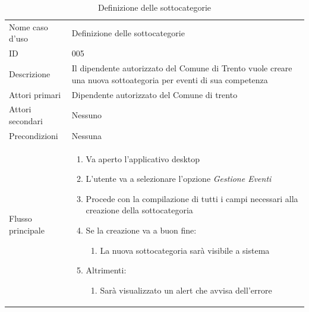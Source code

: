 \documentclass{article}
\begin{document}
\begin{table}[htbp]
    \centering
    \begin{tabularx}{\textwidth}{| l | p{} |}
        \Xhline{2pt} %
        Nome caso d'uso & Definizione delle sottocategorie \\
        \Xhline{2pt} %
        ID & 005 \\
        \hline
        Descrizione & Il dipendente autorizzato del Comune di Trento vuole creare una nuova sottoategoria per eventi di sua competenza\\
        \hline
        Attori primari & Dipendente autorizzato del Comune di trento\\
        \hline
        Attori secondari & Nessuno \\
        \hline
        Precondizioni & Nessuna \\
        \hline
        Flusso principale & 
        \begin{enumerate}[topsep=5pt,partopsep=0pt,parsep=0pt,itemsep=0pt,before=\vspace{-\baselineskip},after=\vspace{-\baselineskip}]                
            \item Va aperto l'applicativo desktop
            \item L'utente va a selezionare l'opzione \textit{Gestione Eventi}
            \item Procede con la compilazione di tutti i campi necessari alla creazione della sottocategoria
            \item Se la creazione va a buon fine:
            \begin{enumerate}[leftmargin=*, nosep]
                \item La nuova sottocategoria sarà visibile a sistema
            \end{enumerate}
            \item Altrimenti:
            \begin{enumerate}[leftmargin=*, nosep]
                \item Sarà visualizzato un alert che avvisa dell'errore
            \end{enumerate}
        \end{enumerate}
        \\
        \hline
    \end{tabularx}
    \caption{Definizione delle sottocategorie}
    \label{tab:tabella_use_case006}
\end{table}
\end{document}
